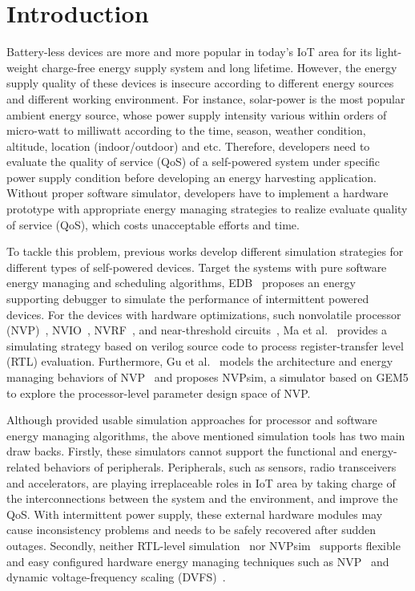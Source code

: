 \section{Introduction}	\label{sec:intro}
%
Battery-less devices are more and more popular in today's IoT area for its light-weight charge-free energy supply system and long lifetime.
However, the energy supply quality of these devices is insecure according to different energy sources and different working environment.
For instance, solar-power is the most popular ambient energy source, whose power supply intensity various within orders of micro-watt to milliwatt according to the time, season, weather condition, altitude, location (indoor/outdoor) and etc. 
Therefore, developers need to evaluate the quality of service (QoS) of a self-powered system under specific power supply condition before developing an energy harvesting application.
Without proper software simulator, developers have to implement a hardware prototype with appropriate energy managing strategies to realize evaluate quality of service (QoS), which costs unacceptable efforts and time.

%
To tackle this problem, previous works develop different simulation strategies for different types of self-powered devices.
Target the systems with pure software energy managing and scheduling algorithms, EDB~\cite{Colin2016An} proposes an energy supporting debugger to simulate the performance of intermittent powered devices.
For the devices with hardware optimizations, such nonvolatile processor (NVP)~\cite{wang20123us,wang2017a,Su2016A,Liu2015Ambient}, NVIO~\cite{li2016hw}, NVRF~\cite{wang2017a130nm}, and near-threshold circuits~\cite{}, Ma et al.~\cite{Ma2015Architecture} provides a simulating strategy based on verilog source code to process register-transfer level (RTL) evaluation.
Furthermore, Gu et al.~\cite{gu2016nvpsim} models the architecture and energy managing behaviors of NVP~\cite{wang20123us} and proposes NVPsim, a simulator based on GEM5 to explore the processor-level parameter design space of NVP.

%
Although provided usable simulation approaches for processor and software energy managing algorithms, the above mentioned simulation tools has two main draw backs. 
Firstly, these simulators cannot support the functional and energy-related behaviors of peripherals.
Peripherals, such as sensors, radio transceivers and accelerators, are playing irreplaceable roles in IoT area by taking charge of the interconnections between the system and the environment, and improve the QoS. 
With intermittent power supply, these external hardware modules may cause inconsistency problems and needs to be safely recovered after sudden outages.
Secondly, neither RTL-level simulation~\cite{Ma2015Architecture} nor NVPsim~\cite{gu2016nvpsim} supports flexible and easy configured hardware energy managing techniques such as NVP~\cite{wang20123us} and dynamic voltage-frequency scaling (DVFS)~\cite{fletcher2017powerDVFS}.

